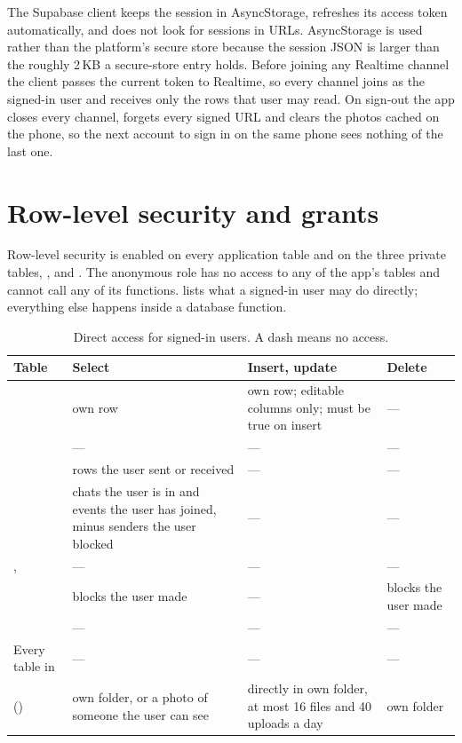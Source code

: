 The Supabase client keeps the session in AsyncStorage, refreshes its access token automatically, and does
not look for sessions in URLs. AsyncStorage is used rather than the platform's secure store because the
session JSON is larger than the roughly 2\,KB a secure-store entry holds. Before joining any Realtime
channel the client passes the current token to Realtime, so every channel joins as the signed-in user and
receives only the rows that user may read. On sign-out the app closes every channel, forgets every
signed URL and clears the photos cached on the phone, so the next account to sign in on the same phone
sees nothing of the last one.

\section{Row-level security and grants}
\label{sec:rls}

Row-level security is enabled on every application table and on the three private tables,
,  and . The
anonymous role has no access to any of the app's tables and cannot call any of its functions.  lists what a
signed-in user may do directly; everything else happens inside a database function.

\begin{table}[ht]
  \centering
  \caption{Direct access for signed-in users. A dash means no access.}
  \label{tab:rls}
  \tablefont
  \begin{tabularx}{\textwidth}{@{}L{28mm}L{34mm}L{30mm}Y@{}}
    \toprule
    \textsf{\textbf{Table}} & \textsf{\textbf{Select}} & \textsf{\textbf{Insert, update}} & \textsf{\textbf{Delete}} \\
    \midrule
     & own row & own row; editable columns only;  must be true on insert & --- \\
     & --- & --- & --- \\
     & rows the user sent or received & --- & --- \\
     & chats the user is in and events the user has joined, minus senders the user blocked & --- & --- \\
    ,  & --- & --- & --- \\
     & blocks the user made & --- & blocks the user made \\
     & --- & --- & --- \\
    Every table in  & --- & --- & --- \\
     () & own folder, or a photo of someone the user can see & directly in own folder, at most 16 files and 40 uploads a day & own folder \\
    \bottomrule
  \end{tabularx}
\end{table}

